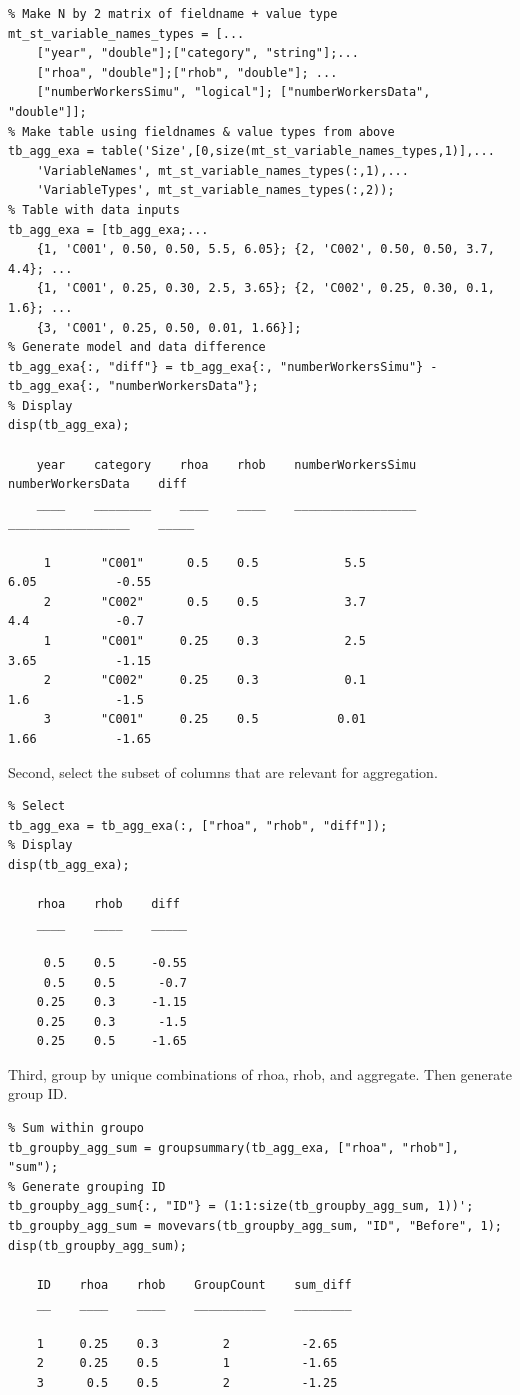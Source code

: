 \documentclass[
]{book}
\begin{document}
\begin{verbatim}
% Make N by 2 matrix of fieldname + value type
mt_st_variable_names_types = [...
    ["year", "double"];["category", "string"];...
    ["rhoa", "double"];["rhob", "double"]; ...
    ["numberWorkersSimu", "logical"]; ["numberWorkersData", "double"]];
% Make table using fieldnames & value types from above
tb_agg_exa = table('Size',[0,size(mt_st_variable_names_types,1)],... 
    'VariableNames', mt_st_variable_names_types(:,1),...
    'VariableTypes', mt_st_variable_names_types(:,2));
% Table with data inputs
tb_agg_exa = [tb_agg_exa;...
    {1, 'C001', 0.50, 0.50, 5.5, 6.05}; {2, 'C002', 0.50, 0.50, 3.7, 4.4}; ...
    {1, 'C001', 0.25, 0.30, 2.5, 3.65}; {2, 'C002', 0.25, 0.30, 0.1, 1.6}; ...
    {3, 'C001', 0.25, 0.50, 0.01, 1.66}];
% Generate model and data difference
tb_agg_exa{:, "diff"} = tb_agg_exa{:, "numberWorkersSimu"} - tb_agg_exa{:, "numberWorkersData"};
% Display
disp(tb_agg_exa);

    year    category    rhoa    rhob    numberWorkersSimu    numberWorkersData    diff 
    ____    ________    ____    ____    _________________    _________________    _____

     1       "C001"      0.5    0.5            5.5                 6.05           -0.55
     2       "C002"      0.5    0.5            3.7                  4.4            -0.7
     1       "C001"     0.25    0.3            2.5                 3.65           -1.15
     2       "C002"     0.25    0.3            0.1                  1.6            -1.5
     3       "C001"     0.25    0.5           0.01                 1.66           -1.65
\end{verbatim}

Second, select the subset of columns that are relevant for aggregation.

\begin{verbatim}
% Select
tb_agg_exa = tb_agg_exa(:, ["rhoa", "rhob", "diff"]);
% Display
disp(tb_agg_exa);

    rhoa    rhob    diff 
    ____    ____    _____

     0.5    0.5     -0.55
     0.5    0.5      -0.7
    0.25    0.3     -1.15
    0.25    0.3      -1.5
    0.25    0.5     -1.65
\end{verbatim}

Third, group by unique combinations of rhoa, rhob, and aggregate. Then
generate group ID.

\begin{verbatim}
% Sum within groupo
tb_groupby_agg_sum = groupsummary(tb_agg_exa, ["rhoa", "rhob"], "sum");
% Generate grouping ID
tb_groupby_agg_sum{:, "ID"} = (1:1:size(tb_groupby_agg_sum, 1))';
tb_groupby_agg_sum = movevars(tb_groupby_agg_sum, "ID", "Before", 1);
disp(tb_groupby_agg_sum);

    ID    rhoa    rhob    GroupCount    sum_diff
    __    ____    ____    __________    ________

    1     0.25    0.3         2          -2.65  
    2     0.25    0.5         1          -1.65  
    3      0.5    0.5         2          -1.25  
\end{verbatim}
\end{document}

